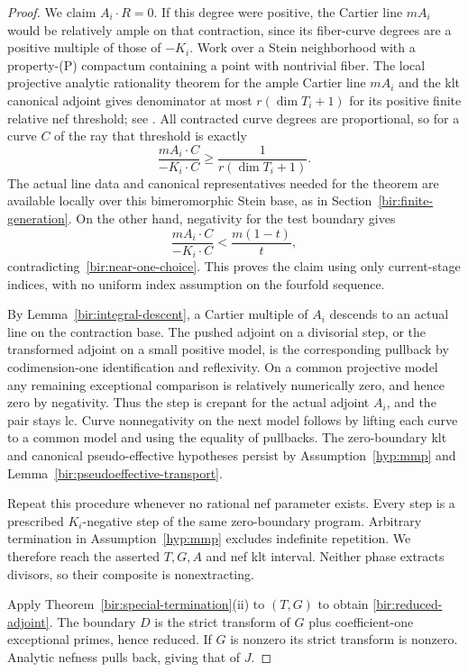 \begin{proof}
We claim $A_i\cdot R=0$.  If this degree were positive, the Cartier
line $mA_i$ would be relatively ample on that contraction, since
its fiber-curve degrees are a positive multiple of those of $-K_i$.
Work over a Stein neighborhood with a property-(P) compactum
containing a point with nontrivial fiber.  The local projective
analytic rationality theorem for the ample Cartier line $mA_i$
and the klt canonical adjoint gives denominator at most
$r(\dim T_i+1)$ for its positive finite relative nef threshold;
see \cite[Theorem~4.3.1 and Remark~4.3.4]{FujinoAnalyticCone}.
All contracted curve degrees are proportional, so for a curve $C$
of the ray that threshold is exactly
\begin{equation}
 \frac{mA_i\cdot C}{-K_i\cdot C}
 \geq\frac{1}{r(\dim T_i+1)}.
 \label{bir:rationality-bound}
\end{equation}
The actual line data and canonical representatives needed for the
theorem are available locally over this bimeromorphic Stein base,
as in Section~\ref{bir:finite-generation}.  On the other hand,
negativity for the test boundary gives
\[
 \frac{mA_i\cdot C}{-K_i\cdot C}
 <\frac{m(1-t)}{t},
\]
contradicting~\eqref{bir:near-one-choice}.  This proves the claim
using only current-stage indices, with no uniform index assumption
on the fourfold sequence.

By Lemma~\ref{bir:integral-descent}, a Cartier multiple of $A_i$
descends to an actual line on the contraction base.  The pushed
adjoint on a divisorial step, or the transformed adjoint on a
small positive model, is the corresponding pullback by
codimension-one identification and reflexivity.  On a common
projective model any remaining exceptional comparison is
relatively numerically zero, and hence zero by negativity.
Thus the step is crepant for the actual adjoint $A_i$, and the
pair stays lc.  Curve nonnegativity on the next model follows by
lifting each curve to a common model and using the equality of
pullbacks.  The zero-boundary klt and canonical pseudo-effective
hypotheses persist by Assumption~\ref{hyp:mmp} and
Lemma~\ref{bir:pseudoeffective-transport}.

Repeat this procedure whenever no rational nef parameter exists.
Every step is a prescribed $K_i$-negative step of the same
zero-boundary program.  Arbitrary termination in
Assumption~\ref{hyp:mmp} excludes indefinite repetition.  We
therefore reach the asserted $T,G,A$ and nef klt interval.  Neither
phase extracts divisors, so their composite is nonextracting.

Apply Theorem~\ref{bir:special-termination}(ii) to $(T,G)$ to obtain
\eqref{bir:reduced-adjoint}.  The boundary $D$ is the strict
transform of $G$ plus coefficient-one exceptional primes, hence
reduced.  If $G$ is nonzero its strict transform is nonzero.
Analytic nefness pulls back, giving that of $J$.


\end{proof}
